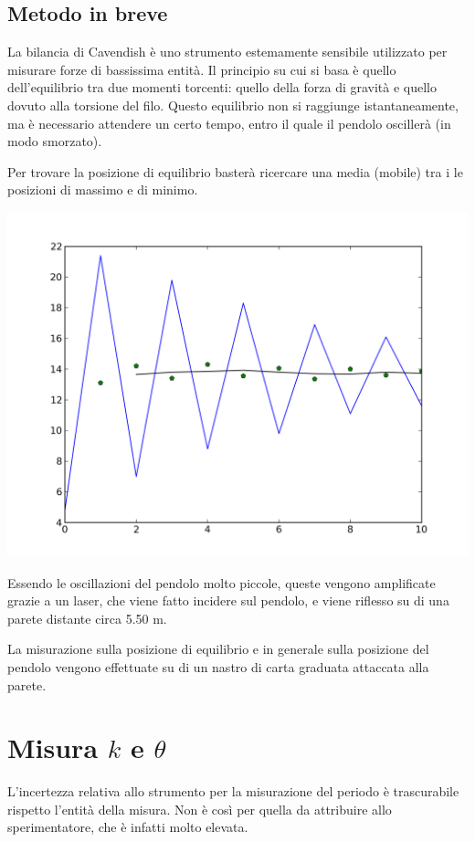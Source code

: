 \subsection{Metodo in breve}
La bilancia di Cavendish è uno strumento estemamente sensibile utilizzato per misurare forze di bassissima entità. Il principio su cui si basa è quello dell'equilibrio tra due momenti torcenti: quello della forza di gravità e quello dovuto alla torsione del filo. Questo equilibrio non si raggiunge istantaneamente, ma è necessario attendere un certo tempo, entro il quale il pendolo oscillerà (in modo smorzato).

Per trovare la posizione di equilibrio basterà ricercare una media (mobile) tra i le posizioni di massimo e di minimo.

\begin{center}
 \includegraphics[scale=0.50]{../grafici/cavendish/oscillazioni.png}
\end{center}

Essendo le oscillazioni del pendolo molto piccole, queste vengono amplificate grazie a un laser, che viene fatto incidere sul pendolo, e viene riflesso su di una parete distante circa 5.50 m.

La misurazione sulla posizione di equilibrio e in generale sulla posizione del pendolo vengono effettuate su di un nastro di carta graduata attaccata alla parete.


\section[Misura di k e theta]{Misura $k$ e $\theta$}
L'incertezza relativa allo strumento per la misurazione del periodo è trascurabile rispetto l'entità della misura. Non è così per quella da attribuire allo sperimentatore, che è infatti molto elevata.

